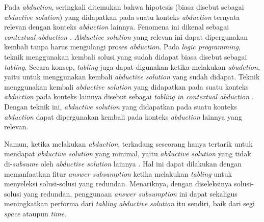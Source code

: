 Pada \textit{abduction}, seringkali ditemukan bahwa hipotesis (biasa disebut sebagai \textit{abductive solution}) yang didapatkan pada suatu konteks \textit{abduction} ternyata relevan dengan konteks \textit{abduction} lainnya. Fenomena ini dikenal sebagai \textit{contextual abduction} \cite{pereira2014contextual}. \textit{Abductive solution} yang relevan ini dapat dipergunakan kembali tanpa harus mengulangi proses \textit{abduction}. Pada \textit{logic programming}, teknik menggunakan kembali solusi yang sudah didapat biasa disebut sebagai \textit{tabling}. Secara konsep, \textit{tabling} juga dapat digunakan ketika melakukan \textit{abudction}, yaitu untuk menggunakan kembali \textit{abductive solution} yang sudah didapat. Teknik menggunakan kembali \textit{abductive solution} yang didapatkan pada suatu konteks \textit{abduction} pada konteks lainnya disebut sebagai \textit{tabling in contextual abduction} \cite{pereira2016programming}. Dengan teknik ini, \textit{abductive solution} yang didapatkan pada suatu konteks \textit{abduction} dapat dipergunakan kembali pada konteks \textit{abduction} lainnya yang relevan.

Namun, ketika melakukan \textit{abduction}, terkadang seseorang hanya tertarik untuk mendapat \textit{abductive solution} yang minimal, yaitu \textit{abductive solution} yang tidak di-\textit{subsume} oleh \textit{abductive solution} lainnya \cite{kakas1992abductive}. Hal ini dapat dilakukan dengan memanfaatkan fitur \textit{answer subsumption} \cite{swift2010tabling} ketika melakukan \textit{tabling} untuk menyeleksi solusi-solusi yang redundan. Menariknya, dengan diseleksinya solusi-solusi yang redundan, penggunaan \textit{answer subsumption} ini dapat sekaligus meningkatkan performa dari \textit{tabling abductive solution} itu sendiri, baik dari segi \textit{space} ataupun \textit{time}.


